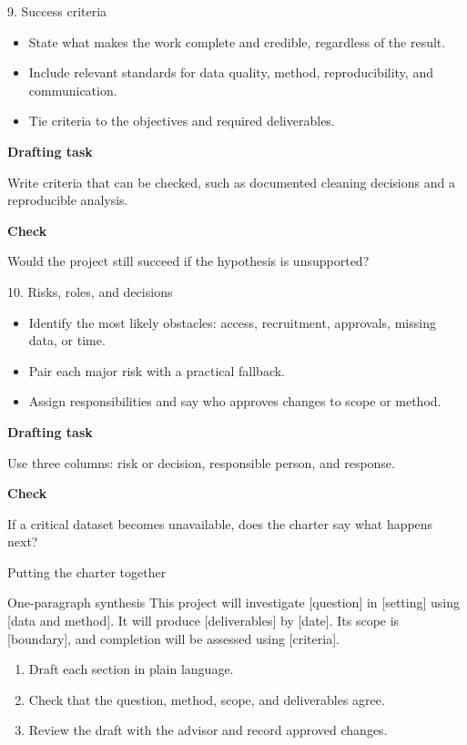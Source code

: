 \documentclass[aspectratio=43,11pt]{beamer}
\newcommand{\draft}[1]{\medskip\textbf{Drafting task}\par #1}
\newcommand{\checkit}[1]{\medskip\textbf{Check}\par #1}
\begin{document}
\begin{frame}{9. Success criteria}
  \begin{itemize}
    \item State what makes the work complete and credible, regardless of the result.
    \item Include relevant standards for data quality, method, reproducibility, and communication.
    \item Tie criteria to the objectives and required deliverables.
  \end{itemize}
  
  \draft{Write criteria that can be checked, such as documented cleaning decisions and a reproducible analysis.}
  
  \checkit{Would the project still succeed if the hypothesis is unsupported?}
\end{frame}

\begin{frame}{10. Risks, roles, and decisions}
  \begin{itemize}
    \item Identify the most likely obstacles: access, recruitment, approvals, missing data, or time.
    \item Pair each major risk with a practical fallback.
    \item Assign responsibilities and say who approves changes to scope or method.
  \end{itemize}
  
  \draft{Use three columns: risk or decision, responsible person, and response.}
  
  \checkit{If a critical dataset becomes unavailable, does the charter say what happens next?}
\end{frame}

\begin{frame}{Putting the charter together}
  \begin{block}{One-paragraph synthesis}
    This project will investigate [question] in [setting] using [data and method].
    It will produce [deliverables] by [date]. Its scope is [boundary], and
    completion will be assessed using [criteria].
  \end{block}
  
  \begin{enumerate}
    \item Draft each section in plain language.
    \item Check that the question, method, scope, and deliverables agree.
    \item Review the draft with the advisor and record approved changes.
  \end{enumerate}
\end{frame}
\end{document}
